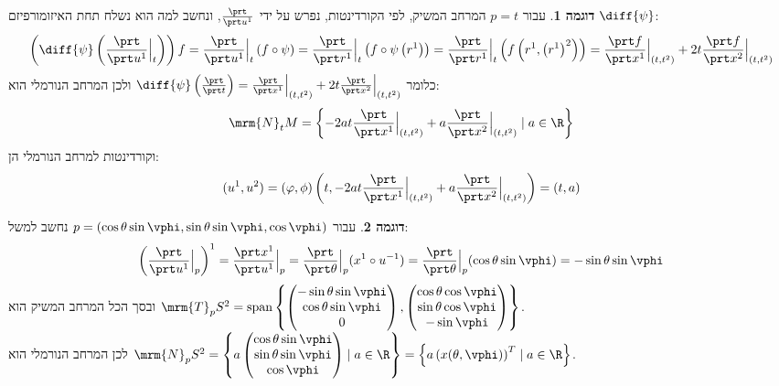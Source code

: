 \documentclass{article}
\theoremstyle{definition}
\newtheorem*{example*}{דוגמה}
\DeclareMathOperator{\spn}{span}
\begin{document}
	\begin{example*}
		עבור
		\(p=t\)
		המרחב המשיק, לפי הקורדינטות, נפרש על ידי
		\(\frac{\prt}{\prt u^1}\),
		ונחשב למה הוא נשלח תחת האיזומורפיזם
		\(\diff{\psi}\):
		\[
			\left(\diff{\psi}\left(\frac{\prt}{\prt u^1}\Big|_t\right)\right)f
			=\frac{\prt}{\prt u^1}\Big|_t\left(f\circ\psi\right)
			=\frac{\prt}{\prt r^1}\Big|_t\left(f\circ\psi\left(r^1\right)\right)
			=\frac{\prt}{\prt r^1}\Big|_t\left(f\left(r^1,\left(r^1\right)^2\right)\right)
			=\frac{\prt f}{\prt x^1}\Big|_{(t,t^2)}+2t\frac{\prt f}{\prt x^2}\Big|_{(t,t^2)}
		\]
		כלומר
		\(
			\diff{\psi}\left(\frac{\prt}{\prt t}\right)
			=\frac{\prt}{\prt x^1}\Big|_{(t,t^2)}+2t\frac{\prt}{\prt x^2}\Big|_{(t,t^2)}
		\)
		ולכן המרחב הנורמלי הוא:
		\[
			\mrm{N}_t M
			= \left\{
				-2at\frac{\prt}{\prt x^1}\Big|_{(t,t^2)}+a\frac{\prt}{\prt x^2}\Big|_{(t,t^2)}
				\mid
				a \in \R
			\right\}
		\]
		וקורדינטות למרחב הנורמלי הן:
		\[
			(u^1,u^2)
			=\left(\varphi,\phi\right)\left(t,-2at\frac{\prt}{\prt x^1}\Big|_{(t,t^2)}+a\frac{\prt}{\prt x^2}\Big|_{(t,t^2)}\right)
			=(t,a)
		\]
	\end{example*}

	\begin{example*}
		עבור
		\(p=(\cos\theta \sin\vphi, \sin\theta \sin\vphi, \cos\vphi)\)
		נחשב למשל:
		\[
			\left(\frac{\prt}{\prt u^1}\Big|_p\right)^1
			= \frac{\prt x^1}{\prt u^1}\Big|_p
			= \frac{\prt}{\prt \theta}\Big|_p (x^1 \circ u^{-1})
			= \frac{\prt}{\prt \theta}\Big|_p (\cos\theta \sin\vphi)
			= -\sin\theta \sin\vphi
		\]
		ובסך הכל המרחב המשיק הוא
		\(
			\mrm{T}_p S^2
			= \spn\left\{
				\begin{pmatrix}
					-\sin\theta \sin\vphi \\ \cos\theta \sin\vphi \\ 0
				\end{pmatrix},
				\begin{pmatrix}
					\cos\theta \cos\vphi \\ \sin\theta \cos\vphi \\ -\sin\vphi
				\end{pmatrix}
			\right\}
		\).
		\\
		לכן המרחב הנורמלי הוא
		\(
			\mrm{N}_p S^2
			= \left\{
				a
				\begin{pmatrix}
					\cos\theta \sin\vphi \\ \sin\theta \sin\vphi \\ \cos\vphi
				\end{pmatrix}
				\mid
				a \in \R
			\right\}
			= \left\{
				a
				\left(x(\theta, \vphi)\right)^T
				\mid
				a \in \R
			\right\}
		\).
	\end{example*}
\end{document}
